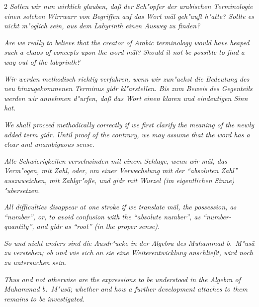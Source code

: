 \documentclass[10pt,a4paper]{article}
\newcommand{\enquote}[1]{``#1''}
\begin{document}
\begin{paracol}{2}
\textit{Sollen wir nun wirklich glauben, da\ss{} der Sch"opfer der arabischen Terminologie einen solchen Wirrwarr von Begriffen auf das Wort \textit{m\=al} geh"auft h"atte? Sollte es nicht m"oglich sein, aus dem Labyrinth einen Ausweg zu finden?}

\switchcolumn

\textit{Are we really to believe that the creator of Arabic terminology would have heaped such a chaos of concepts upon the word \textit{m\=al}? Should it not be possible to find a way out of the labyrinth?}

\switchcolumn*

\textit{Wir werden methodisch richtig verfahren, wenn wir zun"achst die Bedeutung des neu hinzugekommenen Terminus \textit{gidr} kl"arstellen. Bis zum Beweis des Gegenteils werden wir annehmen d"urfen, da\ss{} das Wort einen klaren und eindeutigen Sinn hat.}

\switchcolumn

\textit{We shall proceed methodically correctly if we first clarify the meaning of the newly added term \textit{gidr}. Until proof of the contrary, we may assume that the word has a clear and unambiguous sense.}

\switchcolumn*

\textit{Alle Schwierigkeiten verschwinden mit einem Schlage, wenn wir \textit{m\=al}, das Verm"ogen, mit \textit{Zahl}, oder, um einer Verwechslung mit der \enquote{absoluten Zahl} auszuweichen, mit \textit{Zahlgr"o\ss{}e}, und \textit{gidr} mit \textit{Wurzel} (im eigentlichen Sinne) "ubersetzen.}

\switchcolumn

\textit{All difficulties disappear at one stroke if we translate \textit{m\=al}, the possession, as \enquote{number}, or, to avoid confusion with the \enquote{absolute number}, as \enquote{number-quantity}, and \textit{gidr} as \enquote{root} (in the proper sense).}

\switchcolumn*

\textit{So und nicht anders sind die Ausdr"ucke in der Algebra des Muhammad b.\ M"us\=a zu verstehen; ob und wie sich an sie eine Weiterentwicklung anschlie\ss{}t, wird noch zu untersuchen sein.}

\switchcolumn

\textit{Thus and not otherwise are the expressions to be understood in the Algebra of Muhammad b.\ M"us\=a; whether and how a further development attaches to them remains to be investigated.}

\switchcolumn*


\end{paracol}
\end{document}

